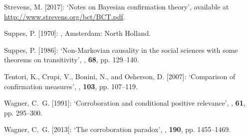 \documentclass[a4paper,11pt]{article}
\begin{document}
\begin{thebibliography}{}
Strevens, M. [2017]:
\newblock `Notes on {B}ayesian confirmation theory',
\newblock available at \href{http://www.strevens.org/bct/BCT.pdf}{http://www.strevens.org/bct/BCT.pdf}.

Suppes, P. [1970]:
,
\newblock Amsterdam: North Holland.

Suppes, P. [1986]:
\newblock `Non-{M}arkovian causality in the social sciences with some theorems
  on transitivity',
, \textbf{68}, pp. 129--140.

Tentori, K., Crupi, V., Bonini, N., and Osherson, D. [2007]:
\newblock `Comparison of confirmation measures',
, \textbf{103}, pp. 107--119.

Wagner, C.~G. [1991]:
\newblock `Corroboration and conditional positive relevance',
, \textbf{61}, pp. 295--300.

Wagner, C.~G. [2013]:
\newblock `The corroboration paradox',
, \textbf{190}, pp. 1455--1469.

\end{thebibliography}
\end{document}
